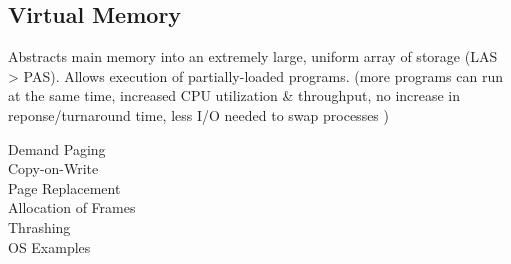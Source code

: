 \subsection*{Virtual Memory}
Abstracts main memory into an extremely large, uniform array of storage (LAS > PAS). Allows execution of partially-loaded programs. (more programs can run at the same time, increased CPU utilization \& throughput, no increase in reponse/turnaround time, less I/O needed to swap processes )
\begin{description}
    \item[Demand Paging]
    \item[Copy-on-Write]
    \item[Page Replacement]
    \item[Allocation of Frames]
    \item[Thrashing]
    \item[OS Examples]
\end{description}
